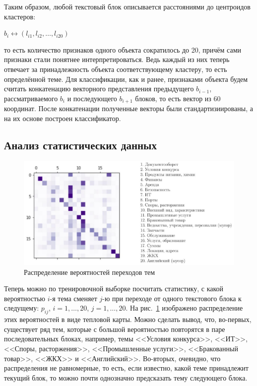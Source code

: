 \documentclass[12pt]{article}
\begin{document}
Таким образом, любой текстовый блок описывается расстояниями до центроидов кластеров:

\begin{center}
	$b_i \leftrightarrow (l_{i1}, l_{i2},\ldots, l_{i20})$
\end{center}

\noindent то есть количество признаков одного объекта сократилось до 20, причём сами признаки стали понятнее интерпретироваться. Ведь каждый из них теперь отвечает за принадлежность объекта соответствующему кластеру, то есть определённой теме. Для классификации, как и ранее, признаками объекта будем считать конкатенацию векторного представления предыдущего $b_{i-1}$, рассматриваемого $b_i$ и последующего $b_{i+1}$ блоков, то есть вектор из 60 координат. После конкатенации полученные векторы были стандартизиированы, а на их основе построен классификатор.


 

\subsection{Анализ статистических данных}
\begin{figure}[h!]
	\includegraphics[scale=0.85]{images/im5.eps}
	\caption{Распределение вероятностей переходов тем}
	\label{im5}
\end{figure}
Теперь можно по тренировочной выборке посчитать статистику, с какой вероятностью $i$-я тема сменяет $j$-ю при переходе от одного текстового блока к следущему: $p_{ij}$, $i = 1,\ldots, 20$, $j = 1,\ldots, 20$. На рис.~\ref{im5} изображено распределение этих вероятностей в виде тепловой карты. Можно сделать вывод, что, во-первых, существует ряд тем, которые с большой вероятностью повторятся в паре последовательных блоках, например, темы <<Условия конкурса>>, <<ИТ>>, <<Споры, расторжения>>, <<Промышленные услуги>>, <<Бракованный товар>>, <<ЖКХ>> и <<Английский>>. Во-вторых, очевидно, что распределения не равномерные, то есть, если известно, какой теме принадлежит текущий блок, то можно почти однозначно предсказать тему следующего блока. 
\end{document}
